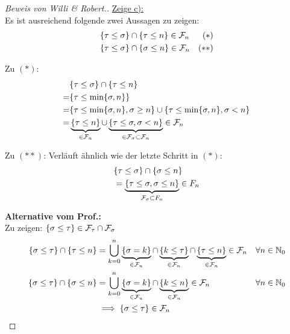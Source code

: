 \begin{proof}[Beweis von Willi \& Robert.]
	\underline{Zeige c):}\\
	Es ist ausreichend folgende zwei Aussagen zu zeigen:
	\begin{align*}
		\lbrace \tau \leq \sigma\rbrace &\cap \lbrace \tau \leq n\rbrace \in \mathcal{F}_n &(\ast)&\\
		\lbrace \tau \leq \sigma\rbrace &\cap \lbrace \sigma \leq n\rbrace \in \mathcal{F}_n &(\ast\ast)& \\
	\end{align*}

	Zu $(\ast)$:
	\begin{align*}
		&\lbrace \tau \leq \sigma\rbrace \cap \lbrace \tau \leq n\rbrace\\
		=&\lbrace \tau \leq \min\{\sigma, n\}\rbrace  \\
		=&\lbrace \tau \leq \min\{\sigma, n\}, \sigma \geq n\rbrace \cup 
		\lbrace \tau \leq \min\{\sigma, n\}, \sigma < n\rbrace \\
		=&\underbrace{\lbrace \tau \leq n\rbrace}_{\in \mathcal{F}_n} \cup
		\underbrace{\lbrace \tau \leq \sigma, \sigma < n\rbrace}_{\in \mathcal{F}_\sigma \subset \mathcal{F}_n} \in \mathcal{F}_n \\
	\end{align*}

	Zu $(\ast\ast)$:
	Verläuft ähnlich wie der letzte Schritt in $(\ast)$:
	\begin{align*}
		&\lbrace \tau \leq \sigma\rbrace \cap \lbrace \sigma \leq n\rbrace \\
		&=\underbrace{\lbrace \tau \leq \sigma, \sigma \leq n\rbrace}_{\mathcal{F}_\sigma \subset F_n} \in F_n \\
	\end{align*}
	
	\textbf{Alternative vom Prof.:}\\
	Zu zeigen: $\lbrace\sigma\leq\tau\rbrace\in\mathcal{F}_\tau\cap\mathcal{F}_\sigma$
	\begin{align*}
		\lbrace\sigma\leq\tau\rbrace\cap\lbrace\tau\leq n\rbrace
		&=\bigcup\limits_{k=0}^n\underbrace{\lbrace \sigma=k\rbrace}_{\in\mathcal{F}_n}\cap\underbrace{\lbrace k\leq\tau\rbrace}_{\in\mathcal{F}_n}\cap\underbrace{\lbrace\tau\leq n\rbrace}_{\in\mathcal{F}_n}\in\mathcal{F}_n &\forall n\in\mathbb{N}_0\\
		\lbrace\sigma\leq\tau\rbrace\cap\lbrace\sigma\leq n\rbrace
		&=\bigcup\limits_{k=0}^n\underbrace{\lbrace\sigma=k\rbrace}_{\in \mathcal{F}_n}\cap\underbrace{\lbrace k\leq n\rbrace}_{\in\mathcal{F}_n}\in\mathcal{F}_n &\forall n\in\mathbb{N}_0\\
		&\implies\lbrace\sigma\leq\tau\rbrace\in\mathcal{F}_n
	\end{align*}


\end{proof}
